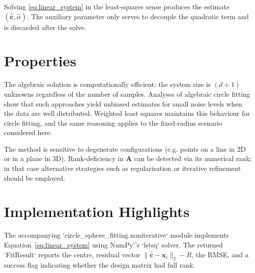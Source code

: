 \documentclass[11pt]{article}
\begin{document}
Solving \eqref{eq:linear_system} in the least-squares sense produces the estimate $(\widehat{\mathbf{c}}, \widehat{\alpha})$. The auxiliary parameter only serves to decouple the quadratic term and is discarded after the solve.

\section{Properties}
The algebraic solution is computationally efficient: the system size is $(d+1)$ unknowns regardless of the number of samples. Analyses of algebraic circle fitting show that such approaches yield unbiased estimates for small noise levels when the data are well distributed. Weighted least squares maintains this behaviour for circle fitting, and the same reasoning applies to the fixed-radius scenario considered here.

The method is sensitive to degenerate configurations (e.g. points on a line in 2D or in a plane in 3D). Rank-deficiency in $\mathbf{A}$ can be detected via its numerical rank; in that case alternative strategies such as regularisation or iterative refinement should be employed.

\section{Implementation Highlights}
The accompanying `circle_sphere_fitting.noniterative` module implements Equation~\eqref{eq:linear_system} using NumPy''s `lstsq` solver. The returned `FitResult` reports the centre, residual vector $\lVert \widehat{\mathbf{c}} - \mathbf{x}_i \rVert_2 - R$, the RMSE, and a success flag indicating whether the design matrix had full rank.
\end{document}
